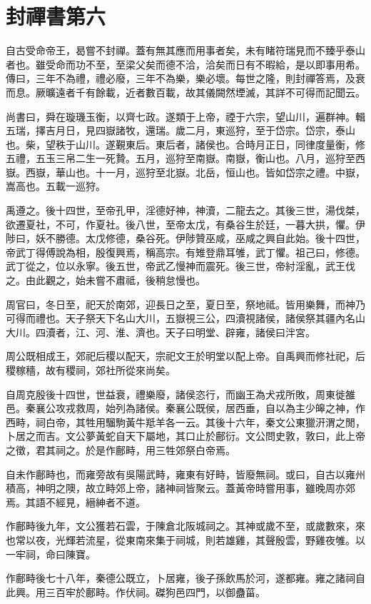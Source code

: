 \chapter{封禪書第六}

自古受命帝王，曷嘗不封禪。蓋有無其應而用事者矣，未有睹符瑞見而不臻乎泰山者也。雖受命而功不至，至梁父矣而德不洽，洽矣而日有不暇給，是以即事用希。傳曰，三年不為禮，禮必廢，三年不為樂，樂必壞。每世之隆，則封禪答焉，及衰而息。厥曠遠者千有餘載，近者數百載，故其儀闕然堙滅，其詳不可得而記聞云。

尚書曰，舜在璇璣玉衡，以齊七政。遂類于上帝，禋于六宗，望山川，遍群神。輯五瑞，擇吉月日，見四嶽諸牧，還瑞。歲二月，東巡狩，至于岱宗。岱宗，泰山也。柴，望秩于山川。遂覲東后。東后者，諸侯也。合時月正日，同律度量衡，修五禮，五玉三帛二生一死贄。五月，巡狩至南嶽。南嶽，衡山也。八月，巡狩至西嶽。西嶽，華山也。十一月，巡狩至北嶽。北岳，恒山也。皆如岱宗之禮。中嶽，嵩高也。五載一巡狩。

禹遵之。後十四世，至帝孔甲，淫德好神，神瀆，二龍去之。其後三世，湯伐桀，欲遷夏社，不可，作夏社。後八世，至帝太戊，有桑谷生於廷，一暮大拱，懼。伊陟曰，妖不勝德。太戊修德，桑谷死。伊陟贊巫咸，巫咸之興自此始。後十四世，帝武丁得傅說為相，殷復興焉，稱高宗。有雉登鼎耳雊，武丁懼。祖己曰，修德。武丁從之，位以永寧。後五世，帝武乙慢神而震死。後三世，帝紂淫亂，武王伐之。由此觀之，始未嘗不肅祗，後稍怠慢也。

周官曰，冬日至，祀天於南郊，迎長日之至，夏日至，祭地祗。皆用樂舞，而神乃可得而禮也。天子祭天下名山大川，五嶽視三公，四瀆視諸侯，諸侯祭其疆內名山大川。四瀆者，江、河、淮、濟也。天子曰明堂、辟雍，諸侯曰泮宮。

周公既相成王，郊祀后稷以配天，宗祀文王於明堂以配上帝。自禹興而修社祀，后稷稼穡，故有稷祠，郊社所從來尚矣。

自周克殷後十四世，世益衰，禮樂廢，諸侯恣行，而幽王為犬戎所敗，周東徙雒邑。秦襄公攻戎救周，始列為諸侯。秦襄公既侯，居西垂，自以為主少皞之神，作西畤，祠白帝，其牲用騮駒黃牛羝羊各一云。其後十六年，秦文公東獵汧渭之閒，卜居之而吉。文公夢黃蛇自天下屬地，其口止於鄜衍。文公問史敦，敦曰，此上帝之徵，君其祠之。於是作鄜畤，用三牲郊祭白帝焉。

自未作鄜畤也，而雍旁故有吳陽武畤，雍東有好畤，皆廢無祠。或曰，自古以雍州積高，神明之隩，故立畤郊上帝，諸神祠皆聚云。蓋黃帝時嘗用事，雖晚周亦郊焉。其語不經見，縉紳者不道。

作鄜畤後九年，文公獲若石雲，于陳倉北阪城祠之。其神或歲不至，或歲數來，來也常以夜，光輝若流星，從東南來集于祠城，則若雄雞，其聲殷雲，野雞夜雊。以一牢祠，命曰陳寶。

作鄜畤後七十八年，秦德公既立，卜居雍，後子孫飲馬於河，遂都雍。雍之諸祠自此興。用三百牢於鄜畤。作伏祠。磔狗邑四門，以御蠱菑。

